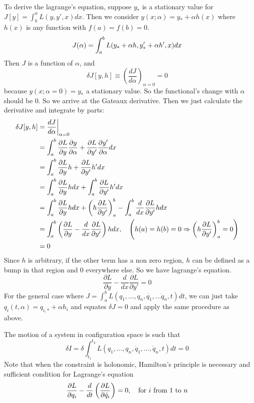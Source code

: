 \documentclass[12pt]{article}
\begin{document}
To derive the lagrange's equation, suppose $y_*$ is a stationary value for $J[y] = \int^a_b L(y, y', x)dx$. Then we consider $y(x; \alpha) = y_* + \alpha h(x)$ where $h(x)$ is any function with $f(a) = f(b) = 0$.
$$ 
 J(\alpha) = \int^b_a L(y_* + \alpha h, y_*' + \alpha h', x)dx \\
$$
Then $J$ is a function of $\alpha$, and 
$$ \delta J[y, h] \equiv \left(\frac{dJ}{d\alpha}\right)_{\alpha = 0} = 0 $$
because $y(x;\alpha = 0) = y_*$ a stationary value. So the functional's change with $\alpha$ should be 0.  So we arrive at the Gateaux derivative.
Then we just calculate the derivative and integrate by parts:
$$
\begin{aligned}
	 \delta J[y, h] &= \frac{dJ}{d\alpha} \bigg\rvert_{\alpha = 0} \\
	   &= \int^b_a \frac{\partial L}{\partial y}\frac{\partial y}{\partial \alpha} + \frac{\partial L}{\partial y'}\frac{\partial y'}{\partial \alpha} dx \\
	   &= \int^b_a \frac{\partial L}{\partial y}h + \frac{\partial L}{\partial y'}h' dx \\
	   &=  \int^b_a \frac{\partial L}{\partial y}h dx + \int^b_a \frac{\partial L}{\partial y'}h' dx \\
	   &=  \int^b_a \frac{\partial L}{\partial y}h dx + \left(h\frac{\partial L}{\partial y'}\right)^b_a - \int^b_a \frac{d}{dx} \frac{\partial L}{\partial y'}h dx \\
	   &= \int^b_a \left(\frac{\partial L}{\partial y} - \frac{d}{dx} \frac{\partial L}{\partial y'}\right) h dx, \quad \left(h(a)=h(b)=0 \Rightarrow \left(h\frac{\partial L}{\partial y'}\right)^b_a = 0\right)\\
	   &= 0
\end{aligned}
$$
Since $h$ is arbitrary, if the other term has a non zero region, $h$ can be defined as a bump in that region and 0 everywhere else. So we have lagrange's equation.
$$\frac{\partial L}{\partial y} - \frac{d}{dx} \frac{\partial L}{\partial y'} = 0$$
For the general case where $J = \int_a^b L(q_1,\ldots, q_n, \dot{q_1}, \ldots \dot{q}_n, t)dt$, we can just take $q_i(t, \alpha) = q_{i,*} + \alpha h_i$ and equates $\delta J = 0$ and apply the same procedure as above.
\begin{theorem}
	\textnormal{The motion of a system in configuration space is such that  $$ 
		\delta I = \delta \int_{t_1}^{t_2} L(q_1, \ldots, q_n, \dot{q}_1, \ldots, \dot{q}_n, t) dt = 0
		$$ 
		Note that when the constraint is holonomic,  Hamilton's principle is necessary and sufficient condition for Lagrange's equation
		$$ \frac{\partial L}{\partial q_i} -  \frac{d}{dt}\left(\frac{\partial L}{\partial \dot{q}_i}\right) = 0, \quad \textnormal{for $i$ from $1$ to $n$}$$
	}
\end{theorem}
\end{document}
